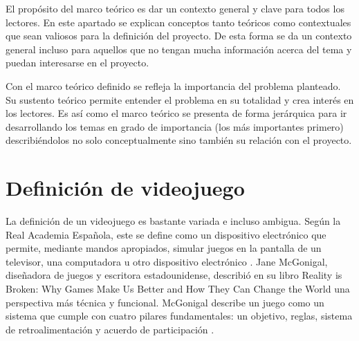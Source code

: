 El propósito del marco teórico es dar un contexto general y clave para todos los lectores. En este apartado se explican conceptos tanto teóricos como contextuales que sean valiosos para la definición del proyecto. De esta forma se da un contexto general incluso para aquellos que no tengan mucha información acerca del tema y puedan interesarse en el proyecto.

Con el marco teórico definido se refleja la  importancia del problema planteado. Su sustento teórico permite entender el problema en su totalidad y crea interés en los lectores. Es así como el marco teórico se presenta de forma jerárquica para ir desarrollando los temas en grado de importancia (los más importantes primero) describiéndolos no solo conceptualmente sino también su relación con el proyecto.

\section{Definición de videojuego}

La definición de un videojuego es bastante variada e incluso ambigua. Según la Real Academia Española, este se define como un dispositivo electrónico que permite, mediante mandos apropiados, simular juegos en la pantalla de un televisor, una computadora u otro dispositivo electrónico \cite{rae2026videojuego}. Jane McGonigal, diseñadora de juegos y escritora estadounidense, describió en su libro Reality is Broken: Why Games Make Us Better and How They Can Change the World una perspectiva más técnica y funcional. McGonigal describe un juego como un sistema que cumple con cuatro pilares fundamentales: un objetivo, reglas, sistema de retroalimentación y acuerdo de participación \cite{mcgonigal2011}.

